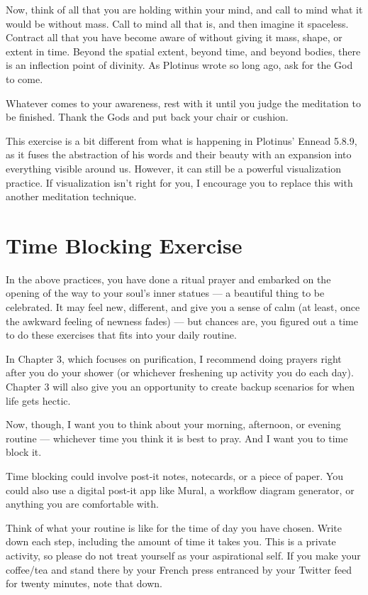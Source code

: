 \documentclass[
]{book}
\begin{document}
Now, think of all that you are holding within your mind, and call to mind what it would be without mass. Call to mind all that is, and then imagine it spaceless. Contract all that you have become aware of without giving it mass, shape, or extent in time. Beyond the spatial extent, beyond time, and beyond bodies, there is an inflection point of divinity. As Plotinus wrote so long ago, ask for the God to come.

Whatever comes to your awareness, rest with it until you judge the meditation to be finished. Thank the Gods and put back your chair or cushion.

This exercise is a bit different from what is happening in Plotinus' Ennead 5.8.9, as it fuses the abstraction of his words and their beauty with an expansion into everything visible around us. However, it can still be a powerful visualization practice. If visualization isn't right for you, I encourage you to replace this with another meditation technique.

\hypertarget{time-blocking-exercise}{%
\section{Time Blocking Exercise}\label{time-blocking-exercise}}

In the above practices, you have done a ritual prayer and embarked on the opening of the way to your soul's inner statues --- a beautiful thing to be celebrated. It may feel new, different, and give you a sense of calm (at least, once the awkward feeling of newness fades) --- but chances are, you figured out a time to do these exercises that fits into your daily routine.

In Chapter 3, which focuses on purification, I recommend doing prayers right after you do your shower (or whichever freshening up activity you do each day). Chapter 3 will also give you an opportunity to create backup scenarios for when life gets hectic.

Now, though, I want you to think about your morning, afternoon, or evening routine --- whichever time you think it is best to pray. And I want you to time block it.

Time blocking could involve post-it notes, notecards, or a piece of paper. You could also use a digital post-it app like Mural, a workflow diagram generator, or anything you are comfortable with.

Think of what your routine is like for the time of day you have chosen. Write down each step, including the amount of time it takes you. This is a private activity, so please do not treat yourself as your aspirational self. If you make your coffee/tea and stand there by your French press entranced by your Twitter feed for twenty minutes, note that down.
\end{document}
